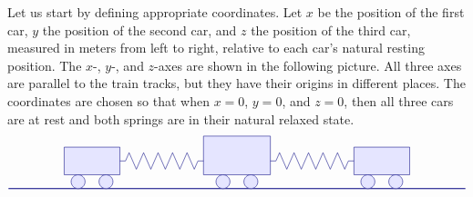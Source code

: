 \begin{solution}
  Let us start by defining appropriate coordinates.  Let $x$ be the
  position of the first car, $y$ the position of the second car, and
  $z$ the position of the third car, measured in meters from left to
  right, relative to each car's natural resting position. The $x$-,
  $y$-, and $z$-axes are shown in the following picture.  All three
  axes are parallel to the train tracks, but they have their origins
  in different places. The coordinates are chosen so that when $x=0$,
  $y=0$, and $z=0$, then all three cars are at rest and both springs
  are in their natural relaxed state.
  \begin{equation*}
    \begin{tikzpicture}[scale=0.8, color=blue!50!black]
      \draw[thick] (0,0) -- (16.4,0);
      \begin{scope}
        \draw[fill=blue!10] (2,0.5) rectangle (4,1.5);
        \draw[fill=blue!10] (2.5,0.25) circle (0.25);
        \draw[fill=blue!10] (3.5,0.25) circle (0.25);
      \end{scope}
      \begin{scope}[xshift=5.2cm]
        \draw[fill=blue!10] (1.8,0.5) rectangle (4.2,1.9);
        \draw[fill=blue!10] (2.5,0.25) circle (0.25);
        \draw[fill=blue!10] (3.5,0.25) circle (0.25);
      \end{scope}
      \begin{scope}[xshift=10.4cm]
        \draw[fill=blue!10] (2,0.5) rectangle (4,1.5);
        \draw[fill=blue!10] (2.5,0.25) circle (0.25);
        \draw[fill=blue!10] (3.5,0.25) circle (0.25);
      \end{scope}
      \begin{scope}[xshift=4cm]
        \draw (0,1) -- ++(0.2,0) -- ++(0.13,0.3)
        -- ++(0.26,-0.6) -- ++(0.26,0.6)
        -- ++(0.26,-0.6) -- ++(0.26,0.6)
        -- ++(0.26,-0.6) -- ++(0.26,0.6)
        -- ++(0.26,-0.6) -- ++(0.26,0.6)
        -- ++(0.26,-0.6) -- ++(0.13,0.3)
        -- ++(0.2,0);
      \end{scope}
      \begin{scope}[xshift=9.4cm]
        \draw (0,1) -- ++(0.2,0) -- ++(0.13,0.3)
        -- ++(0.26,-0.6) -- ++(0.26,0.6)
        -- ++(0.26,-0.6) -- ++(0.26,0.6)
        -- ++(0.26,-0.6) -- ++(0.26,0.6)
        -- ++(0.26,-0.6) -- ++(0.26,0.6)
        -- ++(0.26,-0.6) -- ++(0.13,0.3)
        -- ++(0.2,0);
      \end{scope}
      \begin{scope}[yshift=-1cm, xshift=0cm, color=black]

\end{scope}
\end{tikzpicture}
\end{equation*}
\end{solution}

